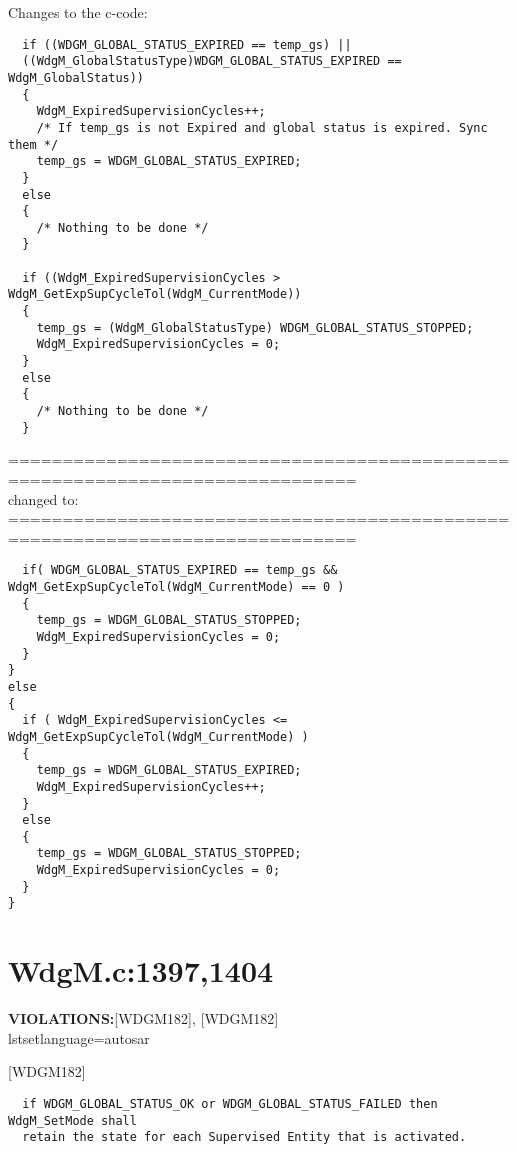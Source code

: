 \documentclass[11pt,a4paper]{article}
\begin{document}

Changes to the c-code:
\begin{lstlisting}
  if ((WDGM_GLOBAL_STATUS_EXPIRED == temp_gs) ||
  ((WdgM_GlobalStatusType)WDGM_GLOBAL_STATUS_EXPIRED == WdgM_GlobalStatus))
  {
    WdgM_ExpiredSupervisionCycles++;
    /* If temp_gs is not Expired and global status is expired. Sync them */
    temp_gs = WDGM_GLOBAL_STATUS_EXPIRED;
  }
  else
  {
    /* Nothing to be done */
  }

  if ((WdgM_ExpiredSupervisionCycles > WdgM_GetExpSupCycleTol(WdgM_CurrentMode))
  {
    temp_gs = (WdgM_GlobalStatusType) WDGM_GLOBAL_STATUS_STOPPED;
    WdgM_ExpiredSupervisionCycles = 0;
  }
  else
  {
    /* Nothing to be done */
  }
\end{lstlisting}
==============================================================================\\
changed to:\\
==============================================================================
\begin{lstlisting}
  if( WDGM_GLOBAL_STATUS_EXPIRED == temp_gs && WdgM_GetExpSupCycleTol(WdgM_CurrentMode) == 0 )
  {
    temp_gs = WDGM_GLOBAL_STATUS_STOPPED;
    WdgM_ExpiredSupervisionCycles = 0;
  }
}
else
{
  if ( WdgM_ExpiredSupervisionCycles <= WdgM_GetExpSupCycleTol(WdgM_CurrentMode) )
  {
    temp_gs = WDGM_GLOBAL_STATUS_EXPIRED;
    WdgM_ExpiredSupervisionCycles++;
  }
  else
  {
    temp_gs = WDGM_GLOBAL_STATUS_STOPPED;
    WdgM_ExpiredSupervisionCycles = 0;
  }
}
\end{lstlisting}
\newpage

\section{WdgM.c:1397,1404}
\textbf{VIOLATIONS:}[WDGM182], [WDGM182]\\

lstset{language=autosar}

[WDGM182]
\begin{lstlisting}
  if WDGM_GLOBAL_STATUS_OK or WDGM_GLOBAL_STATUS_FAILED then WdgM_SetMode shall
  retain the state for each Supervised Entity that is activated.
\end{lstlisting}~\\
\end{document}
